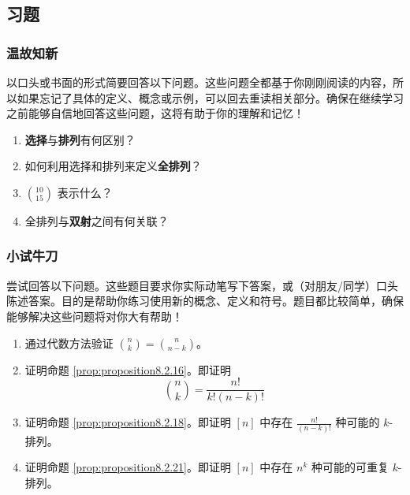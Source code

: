 
\subsection{习题}\label{sec:section8.2.4}

\subsubsection*{温故知新}

以口头或书面的形式简要回答以下问题。这些问题全都基于你刚刚阅读的内容，所以如果忘记了具体的定义、概念或示例，可以回去重读相关部分。确保在继续学习之前能够自信地回答这些问题，这将有助于你的理解和记忆！

\begin{enumerate}[label=(\arabic*)]
    \item \textbf{选择}与\textbf{排列}有何区别？
    \item 如何利用选择和排列来定义\textbf{全排列}？
    \item $\displaystyle {10 \choose 15}$ 表示什么？\\
    \item 全排列与\textbf{双射}之间有何关联？
\end{enumerate}

\subsubsection*{小试牛刀}

尝试回答以下问题。这些题目要求你实际动笔写下答案，或（对朋友/同学）口头陈述答案。目的是帮助你练习使用新的概念、定义和符号。题目都比较简单，确保能够解决这些问题将对你大有帮助！

\begin{enumerate}[label=(\arabic*)]
    \item 通过代数方法验证 $\displaystyle {n \choose k} = {n \choose {n-k}}$。\\
    \item 证明命题 \ref{prop:proposition8.2.16}。即证明
        \[{n \choose k} = \frac{n!}{k!(n-k)!}\]\label{exc:exercises8.2.2}
    \item 证明命题 \ref{prop:proposition8.2.18}。即证明 $[n]$ 中存在 $\displaystyle \frac{n!}{(n-k)!}$ 种可能的 $k$-排列。\\ \label{exc:exercises8.2.3}
    \item 证明命题 \ref{prop:proposition8.2.21}。即证明 $[n]$ 中存在 $n^k$ 种可能的可重复 $k$-排列。\label{exc:exercises8.2.4}
\end{enumerate}